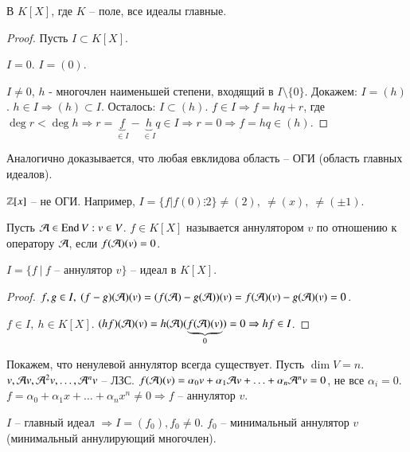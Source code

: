 \documentclass[main]{subfiles}
\begin{document}
\begin{corollary}
    В $K[X]$, где $K$ -- поле, все идеалы главные.
\end{corollary}

\begin{proof}
    Пусть $I \subset K[X]$.

    $I = 0$. $I = (0)$.

    $I \neq 0 $, $h$ - многочлен наименьшей степени, входящий в $I\setminus \{0\}$.
    Докажем: $I = (h)$. $h \in I \Rightarrow (h) \subset I$.
    Осталось: $I \subset (h)$. $f \in I \Rightarrow f=hq+r$, где $\deg r < \deg h
        \Rightarrow r = \underbrace{f}_{\in I} - \underbrace{h}_{\in I} q \in I \Rightarrow r = 0 \Rightarrow f = hq \in (h)$.
\end{proof}

\begin{remark}
    Аналогично доказывается, что любая евклидова область -- ОГИ (область главных идеалов).
\end{remark}

\begin{remark}
    $\mathbb{Z}[x]$ -- не ОГИ. Например, $I = \{f|f(0) \vdots 2\} \neq (2),\ \neq (x),\ \neq (\pm 1)$.
\end{remark}

\begin{definition} [Аннулятор]
    Пусть $\mathcal{A} \in \operatorname{End} V : v\in V$. $f \in K[X]$ называется аннулятором $v$ по отношению к оператору $\mathcal{A}$, если $f(\mathcal{A})(v) = 0$.
\end{definition}

\begin{lemma}
    $I = \{f \ | \ f$ -- аннулятор $v \}$ -- идеал в $K[X]$.
\end{lemma}

\begin{proof}
    $f, g \in I,\ (f-g)(\mca)(v) = (f(\mca)-g(\mca))(v) = f(\mca)(v) - g(\mca)(v) = 0$.

    $f \in I,\ h \in K[X]$. $(hf)(\mathcal{A})(v) = h(\mathcal{A})(\underbrace{f(\mathcal{A})(v)}_{0}) = 0 \Rightarrow hf \in I$.
\end{proof}

Покажем, что ненулевой аннулятор всегда существует. Пусть $\dim V = n$. $v, \mathcal{A} v, {\mathcal{A}}^2 v, \ldots, {\mathcal{A}}^n v$ -- ЛЗС.
$f(\mathcal{A})(v) = \alpha_0 v + \alpha_1 \mathcal{A} v + \ldots + \alpha_n {\mathcal{A}}^n v = 0$, не все $\alpha_i =0$.
$f = \alpha_0 + \alpha_1 x + \ldots + \alpha_n x^n \neq 0 \Rightarrow f$ -- аннулятор $v$.

$I$ -- главный идеал $\Rightarrow I=(f_0), f_0 \neq 0$. $f_0$ -- минимальный аннулятор $v$ (минимальный аннулирующий многочлен).
\end{document}
